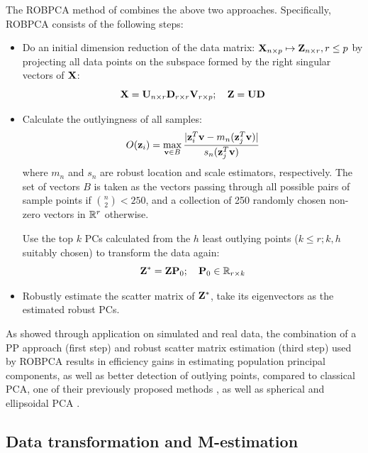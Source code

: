 The ROBPCA method of \cite{hubert05} combines the above two approaches. Specifically, ROBPCA consists of the following steps:
%
\begin{itemize}
\item Do an initial dimension reduction of the data matrix: ${\mathbf{X}}_{n \times p} \mapsto {\mathbf{Z}}_{n \times r}, r \leq p$ by projecting all data points on the subspace formed by the right singular vectors of ${\mathbf{X}}$:
%
$$
{\mathbf{X}} = {\mathbf{U}}_{n \times r} {\mathbf{D}}_{r \times r} {\mathbf{V}}_{r \times p}; \quad
{\mathbf{Z}} = {\mathbf{U}} {\mathbf{D}}
$$

\item Calculate the outlyingness of all samples:
%
$$
O({\bf{z}}_i) = \max_{{\bf{v}} \in B} \frac{| {\bf{z}}_i^T {\bf{v}} - m_n ({\bf{z}}_j^T {\bf{v}})|}{s_n ({\bf{z}}_j^T {\bf{v}} )}
$$
%
where $m_n$ and $s_n$ are robust location and scale estimators, respectively. The set of vectors $B$ is taken as the vectors passing through all possible pairs of sample points if $\binom{n}{2} < 250$, and a collection of 250 randomly chosen non-zero vectors in ${\mathbb{R}}^{r}$ otherwise.

Use the top $k$ PCs calculated from the $h$ least outlying points ($k \leq r; k, h$ suitably chosen) to transform the data again:
%
$$
{\mathbf{Z}}^* =  {\mathbf{Z}} {\mathbf{P}}_0; \quad {\mathbf{P}}_0 \in {\mathbb{R}}_{r \times k}
$$


\item Robustly estimate the scatter matrix of ${\mathbf{Z}}^*$, take its eigenvectors as the estimated robust PCs.
\end{itemize}

As \cite{hubert05} showed through application on simulated and real data, the combination of a PP approach (first step) and robust scatter matrix estimation (third step) used by ROBPCA results in efficiency gains in estimating population principal components, as well as better detection of outlying points, compared to classical PCA, one of their previously proposed methods \citep{HubertEtal02}, as well as spherical and ellipsoidal PCA \citep{LocantoreEtal99}.

\subsection*{\sffamily \large Data transformation and M-estimation}

